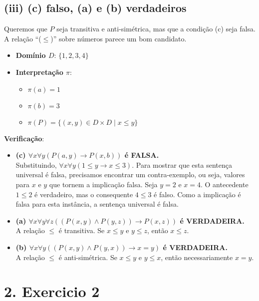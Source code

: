 \documentclass{article}
\begin{document}
\subsection*{(iii) (c) falso, (a) e (b) verdadeiros}
Queremos que $P$ seja transitiva e anti-simétrica, mas que a condição (c) seja falsa. A relação ``($\le$)'' sobre números parece um bom candidato.

\begin{itemize}
    \item \textbf{Domínio $D$}: $\{1, 2, 3, 4\}$
    \item \textbf{Interpretação $\pi$}:
    \begin{itemize}
        \item $\pi(a) = 1$
        \item $\pi(b) = 3$
        \item $\pi(P) = \{(x,y) \in D \times D \mid x \le y\}$
    \end{itemize}
\end{itemize}

\textbf{Verificação}:
\begin{itemize}
    \item \textbf{(c) $\forall x\forall y(P(a,y)\rightarrow P(x,b))$ é FALSA.} \\
    Substituindo, $\forall x\forall y(1 \le y \rightarrow x \le 3)$. Para mostrar que esta sentença universal é falsa, precisamos encontrar um contra-exemplo, ou seja, valores para $x$ e $y$ que tornem a implicação falsa.
    Seja $y=2$ e $x=4$. O antecedente $1 \le 2$ é verdadeiro, mas o consequente $4 \le 3$ é falso. Como a implicação é falsa para esta instância, a sentença universal é falsa.
    
    \item \textbf{(a) $\forall x\forall y\forall z((P(x,y)\wedge P(y,z))\rightarrow P(x,z))$ é VERDADEIRA.} \\
    A relação $\le$ é transitiva. Se $x \le y$ e $y \le z$, então $x \le z$.
    
    \item \textbf{(b) $\forall x\forall y((P(x,y)\wedge P(y,x))\rightarrow x=y)$ é VERDADEIRA.} \\
    A relação $\le$ é anti-simétrica. Se $x \le y$ e $y \le x$, então necessariamente $x = y$.
\end{itemize}

\newpage
\section*{2. Exercicio 2}
\end{document}
